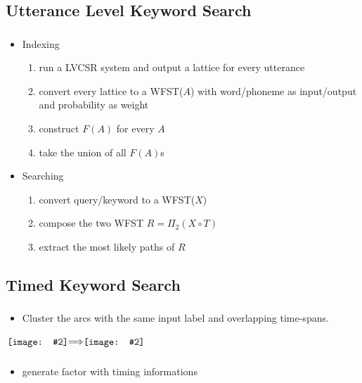 \documentclass{beamer}
\newcommand*{\vcenterimage}[2][]{\vcenter{\hbox{\texttt{[image: \#2]}}}}
\newcommand*{\vcenterarrow}{\vcenter{\hbox{$\Longrightarrow$}}}
\begin{document}
\subsection{Utterance Level Keyword Search}
\frame
{
  \frametitle{\subsecname}
  
  \begin{itemize}
  \item<1->{Indexing}
    \begin{enumerate}
    \item{run a LVCSR system and output a lattice for every utterance}
    \item{convert every lattice to a WFST($A$) with word/phoneme as input/output and probability as weight}
    \item{construct $F(A)$ for every $A$}
    \item{take the union of all $F(A)$s}
    \end{enumerate}
    
  \item<2->{Searching}
    \begin{enumerate}
    \item{convert query/keyword to a WFST($X$)}
    \item{compose the two WFST $R = \Pi_2(X \circ T)$}
    \item{extract the most likely paths of $R$}
    \end{enumerate}
  \end{itemize}
}

\subsection{Timed Keyword Search}
\frame
{
  \frametitle{\subsecname}
  
  \begin{itemize}
  \item{Cluster the arcs with the same input label and overlapping time-spans.}
  \end{itemize}
  
   $\vcenterimage[width=.4\textwidth]{wfst.png}\vcenterarrow\vcenterimage[width=.5\textwidth]{wfst_cluster.png}$
}

\frame
{
  \frametitle{\subsecname}
  
  \begin{itemize}
  \item{generate factor with timing informations}
  \end{itemize}
  
 }
\end{document}
